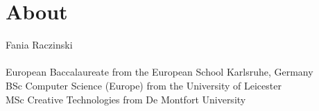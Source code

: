 
\pagestyle{empty}

\chapter{About}
\label{about}

Fania Raczinski\\
\\
European Baccalaureate from the European School Karlsruhe, Germany\\
BSc Computer Science (Europe) from the University of Leicester\\
MSc Creative Technologies from De Montfort University\\

\clearpage
